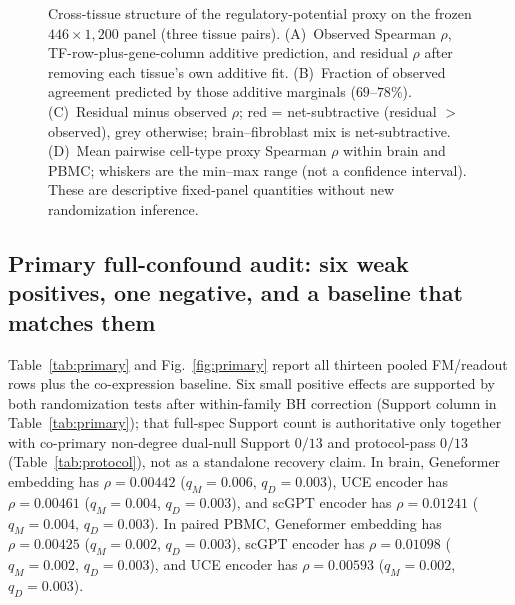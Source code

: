 \documentclass[fleqn,10pt,lineno]{wlpeerj}
\newcommand{\fitfig}[1]{\resizebox{\ifdim\width>\linewidth\linewidth\else\width\fi}{!}{#1}}
\begin{document}
\begin{figure}[!tbp]\centering
\fitfig{}
\caption{Cross-tissue structure of the regulatory-potential proxy on the frozen
$446\times 1{,}200$ panel (three tissue pairs). (A)~Observed Spearman $\rho$,
TF-row-plus-gene-column additive prediction, and residual $\rho$ after removing
each tissue's own additive fit. (B)~Fraction of observed agreement predicted by
those additive marginals ($69$--$78\%$). (C)~Residual minus observed $\rho$;
red = net-subtractive (residual $>$ observed), grey otherwise; brain--fibroblast
mix is net-subtractive. (D)~Mean pairwise cell-type proxy Spearman $\rho$ within
brain and PBMC; whiskers are the min--max range (not a confidence interval).
These are descriptive fixed-panel quantities without new randomization inference.}\label{fig:decomp}
\end{figure}

\begin{table}[!tbp]\centering
\fitfig{}
\caption{Observed cross-tissue reproducibility of the regulatory-potential proxy on the frozen
$446\times 1{,}200$ panel ($n=3$ tissue pairs). Columns: observed Spearman $\rho$; additive
fraction of that agreement from TF-row plus gene-column marginals; residual Spearman after each
tissue's own additive fit; binary-support $\varphi$ (phi coefficient of nonzero-edge
presence/absence); edge Jaccard; mean per-TF-row Spearman; shared TF count ($446$). Fixed-panel
descriptive quantities; no confidence interval or new randomization inference.}
\label{tab:cross}
\end{table}

\subsection{Primary full-confound audit: six weak positives, one negative, and a baseline that
matches them}
Table~\ref{tab:primary} and Fig.~\ref{fig:primary} report all thirteen pooled FM/readout rows plus
the co-expression baseline. Six small positive effects are supported by both randomization tests
after within-family BH correction (Support column in Table~\ref{tab:primary}); that full-spec Support
count is authoritative only together with co-primary non-degree dual-null Support $0/13$ and
protocol-pass $0/13$ (Table~\ref{tab:protocol}), not as a standalone recovery claim. In brain,
Geneformer embedding has $\rho=0.00442$
($q_M=0.006$, $q_D=0.003$), UCE encoder has $\rho=0.00461$ ($q_M=0.004$, $q_D=0.003$), and scGPT
encoder has $\rho=0.01241$ ($q_M=0.004$, $q_D=0.003$). In paired PBMC, Geneformer embedding has
$\rho=0.00425$ ($q_M=0.002$, $q_D=0.003$), scGPT encoder has $\rho=0.01098$ ($q_M=0.002$,
$q_D=0.003$), and UCE encoder has $\rho=0.00593$ ($q_M=0.002$, $q_D=0.003$).
\end{document}
